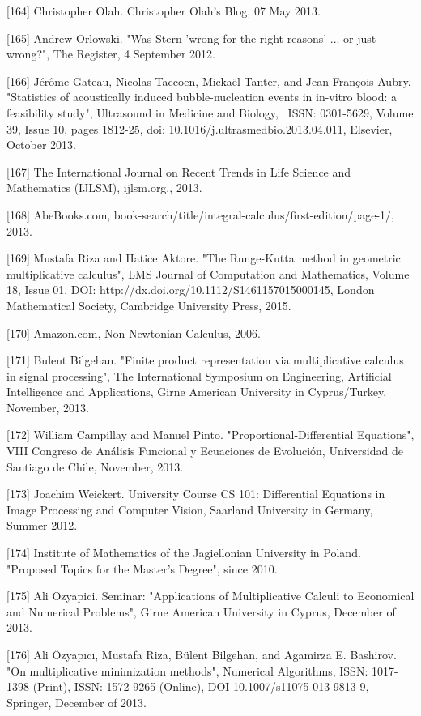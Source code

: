 \documentclass[12pt]{article}
\begin{document}
[164] Christopher Olah. Christopher Olah's Blog, 07 May 2013.

[165] Andrew Orlowski. "Was Stern 'wrong for the right reasons' ... or just wrong?", The Register, 4 September 2012.

[166] Jérôme Gateau, Nicolas Taccoen, Mickaël Tanter, and Jean-François Aubry. "Statistics of acoustically induced bubble-nucleation events in in-vitro blood: a feasibility study", Ultrasound in Medicine and Biology,  ISSN: 0301-5629, Volume 39, Issue 10, pages 1812-25, doi: 10.1016/j.ultrasmedbio.2013.04.011, Elsevier, October 2013.

[167] The International Journal on Recent Trends in Life Science and Mathematics (IJLSM), ijlsm.org., 2013.

[168] AbeBooks.com, book-search/title/integral-calculus/first-edition/page-1/, 2013.

[169] Mustafa Riza and Hatice Aktore. "The Runge-Kutta method in geometric multiplicative calculus", LMS Journal of Computation and Mathematics, Volume 18, Issue 01, DOI: http://dx.doi.org/10.1112/S1461157015000145, London Mathematical Society, Cambridge University Press, 2015.

[170] Amazon.com, Non-Newtonian Calculus, 2006.

[171] Bulent Bilgehan. "Finite product representation via multiplicative calculus in signal processing", The International Symposium on Engineering, Artificial Intelligence and Applications, Girne American University in Cyprus/Turkey, November, 2013.

[172] William Campillay and Manuel Pinto. "Proportional-Differential Equations", VIII Congreso de Análisis Funcional y Ecuaciones de Evolución, Universidad de Santiago de Chile, November, 2013.

[173] Joachim Weickert. University Course CS 101: Differential Equations in Image Processing and Computer Vision, Saarland University in Germany, Summer 2012.

[174] Institute of Mathematics of the Jagiellonian University in Poland. "Proposed Topics for the Master's Degree", since 2010.

[175] Ali Ozyapici. Seminar: "Applications of Multiplicative Calculi to Economical and Numerical Problems", Girne American University in Cyprus, December of 2013.

[176] Ali Özyapıcı, Mustafa Riza, Bülent Bilgehan, and Agamirza E. Bashirov. "On multiplicative minimization methods", Numerical Algorithms, ISSN: 1017-1398 (Print), ISSN: 1572-9265 (Online), DOI 10.1007/s11075-013-9813-9, Springer, December of 2013.
\end{document}
